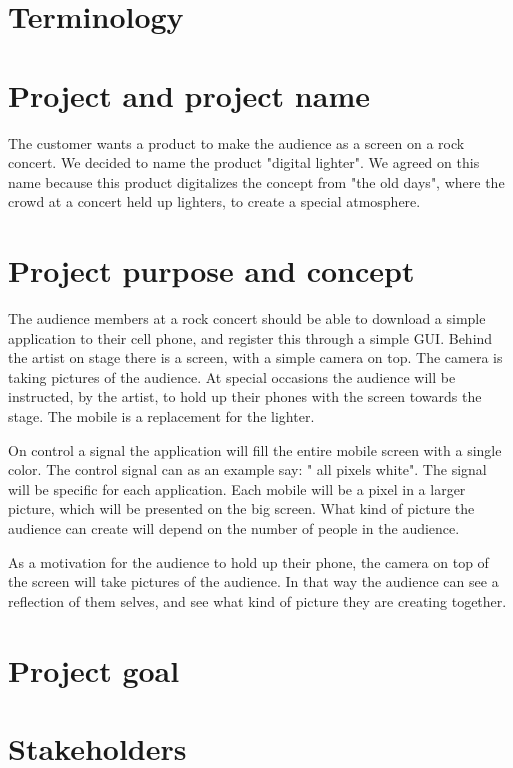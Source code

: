 \section {Terminology}
\section{Project and project name}

The customer wants a product to make the audience as a screen on a rock concert. We decided to name the product "digital lighter". We agreed on this name because this product digitalizes the concept from "the old days", where the crowd at a concert held up lighters, to create a special atmosphere. 

\section{Project purpose and concept}

The audience members at a rock concert should be able to download a simple application to their cell phone, and register this through a simple GUI.
Behind the artist on stage there is a screen, with a simple camera on top. 
The camera is taking pictures of the audience. 
At special occasions the audience will be instructed, by the artist, to hold up their phones with the screen towards the stage. 
The mobile is a replacement for the lighter.  

On control a signal the application will fill the entire mobile screen with a single color.
The control signal can as an example say: " all pixels white". 
The signal will be specific for each application.
Each mobile will be a pixel in a larger picture, which will be presented on the big screen. 
What kind of picture the audience can create will depend on the number of people in the audience.   

As a motivation for the audience to hold up their phone, the camera on top of the screen will take pictures of the audience.
In that way the audience can see a reflection of them selves, and see what kind of picture they are creating together.

\section{Project goal}

\section{Stakeholders}

